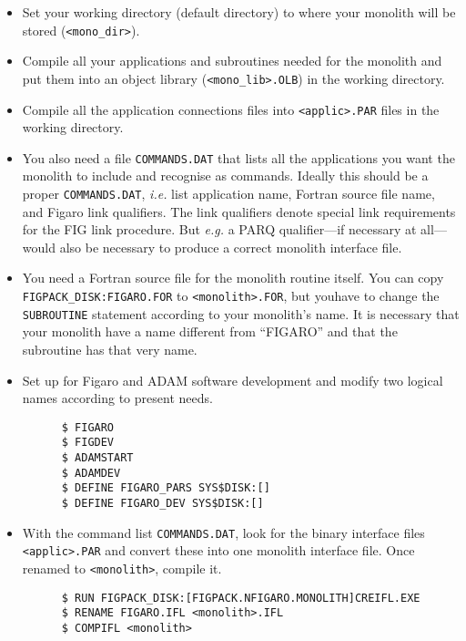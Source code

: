 \begin{itemize}

\item Set your working directory (default directory) to where your monolith
will be stored ({\tt <mono\_dir>}).

\item Compile all your applications and subroutines needed for the monolith and
put them into an object library ({\tt <mono\_lib>.OLB}) in the working
directory.

\item Compile all the application connections files into {\tt <applic>.PAR}
files in the working directory.

\item You also need a file {\tt COMMANDS.DAT} that lists all the applications
you want the monolith to include and recognise as commands. Ideally this should
be a proper {\tt COMMANDS.DAT}, {\em i.e.\/} list application name, Fortran
source file name, and Figaro link qualifiers. The link qualifiers denote
special link requirements for the FIG link procedure. But {\em e.g.\/} a PARQ
qualifier---if necessary at all---would also be necessary to produce a
correct monolith interface file.

\item You need a Fortran source file for the monolith routine itself. You can
copy {\tt FIGPACK\_\-DISK:\-FIGARO.FOR}
to {\tt <monolith>.FOR}, but you\linebreak have to change the {\tt SUBROUTINE}
statement according to your monolith's name. It is necessary that your monolith
have a name different from ``FIGARO'' and that the subroutine has that very 
name.

\item Set up for Figaro and ADAM software development and modify two logical
names according to present needs.

\begin{verbatim}
      $ FIGARO
      $ FIGDEV
      $ ADAMSTART
      $ ADAMDEV
      $ DEFINE FIGARO_PARS SYS$DISK:[]
      $ DEFINE FIGARO_DEV SYS$DISK:[]
\end{verbatim}

\item With the command list {\tt COMMANDS.DAT}, look for the binary interface
files {\tt <applic>.PAR} and convert these into one monolith interface file.
Once renamed to {\tt <monolith>}, compile it. 

\begin{verbatim}
      $ RUN FIGPACK_DISK:[FIGPACK.NFIGARO.MONOLITH]CREIFL.EXE 
      $ RENAME FIGARO.IFL <monolith>.IFL 
      $ COMPIFL <monolith> 
\end{verbatim} 


\end{itemize}
